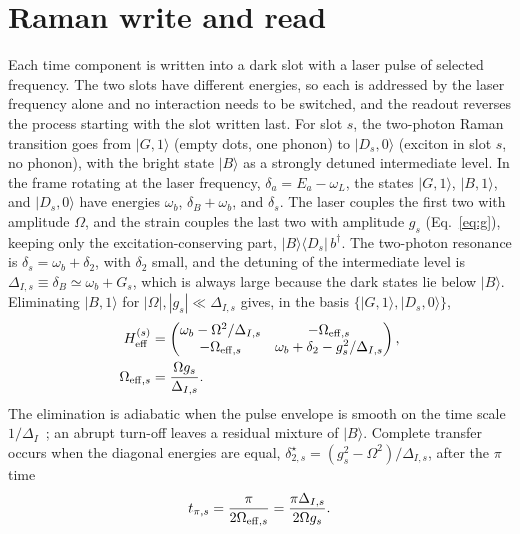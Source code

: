 \documentclass[aps,pra,preprint,groupedaddress,amsmath,amssymb,floatfix]{revtex4-2}
\newcommand{\ket}[1]{\lvert #1\rangle}
\newcommand{\bra}[1]{\langle #1\rvert}
\newcommand{\wb}{\omega_b}
\begin{document}
\section{Raman write and read}
\label{sec:raman}

Each time component is written into a dark slot with a laser pulse of selected frequency. The two slots have different energies, so each is addressed by the laser frequency alone and no interaction needs to be switched, and the readout reverses the process starting with the slot written last. For slot $s$, the two-photon Raman transition goes from $\ket{G,1}$ (empty dots, one phonon) to $\ket{D_s,0}$ (exciton in slot $s$, no phonon), with the bright state $\ket B$ as a strongly detuned intermediate level. In the frame rotating at the laser frequency, $\delta_a=E_a-\omega_L$, the states $\ket{G,1}$, $\ket{B,1}$, and $\ket{D_s,0}$ have energies $\wb$, $\delta_B+\wb$, and $\delta_s$. The laser couples the first two with amplitude $\Omega$, and the strain couples the last two with amplitude $g_s$ (Eq.~\eqref{eq:g}), keeping only the excitation-conserving part, $\ket B\bra{D_s}\,b^\dagger$. The two-photon resonance is $\delta_s=\wb+\delta_2$, with $\delta_2$ small, and the detuning of the intermediate level is $\Delta_{I,s}\equiv\delta_B\simeq\wb+G_s$, which is always large because the dark states lie below $\ket B$. Eliminating $\ket{B,1}$ for $|\Omega|,|g_s|\ll\Delta_{I,s}$ gives, in the basis $\{\ket{G,1},\ket{D_s,0}\}$,
\begin{align}
H_{\rm eff}^{(s)}&=
\begin{pmatrix}
\wb-\Omega^2/\Delta_{I,s}&-\Omega_{{\rm eff},s}\\
-\Omega_{{\rm eff},s}&\wb+\delta_2-g_s^2/\Delta_{I,s}
\end{pmatrix},\nonumber\\
\Omega_{{\rm eff},s}&=\frac{\Omega g_s}{\Delta_{I,s}}.\label{eq:heff}
\end{align}
The elimination is adiabatic when the pulse envelope is smooth on the time scale $1/\Delta_I$~\cite{brion2007,reiter2012}; an abrupt turn-off leaves a residual mixture of $\ket B$. Complete transfer occurs when the diagonal energies are equal, $\delta_{2,s}^{\star}=(g_s^2-\Omega^2)/\Delta_{I,s}$, after the $\pi$ time
\begin{equation}
t_{\pi,s}=\frac{\pi}{2\Omega_{{\rm eff},s}}=\frac{\pi\Delta_{I,s}}{2\Omega g_s}.\label{eq:tpi}
\end{equation}
\end{document}
